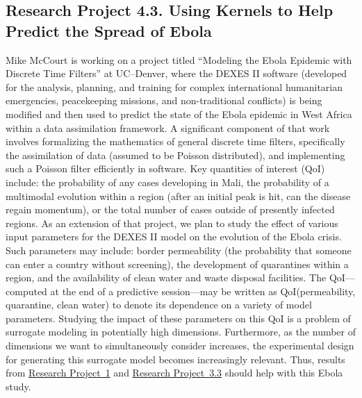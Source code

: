 \documentclass[11pt]{NSFamsart}
\newcommand{\refproba}{\hyperref[SectHSSVD]{Research Project~1}\xspace}
\newcommand{\refprobcc}{\hyperref[designsubsec]{Research Project~3.3}\xspace}
\begin{document}
\subsection*{Research Project 4.3. Using Kernels to Help Predict the Spread of Ebola} \label{ebolasubsec}
Mike McCourt is working on a project titled ``Modeling the Ebola Epidemic with Discrete Time Filters'' at UC--Denver, where the DEXES II software (developed for the analysis, planning, and training for complex international humanitarian emergencies, peacekeeping missions, and non-traditional conflicts) is being modified and then used to predict the state of the Ebola epidemic in West Africa within a data assimilation framework. A significant component of that work involves formalizing the mathematics of general discrete time filters, specifically the assimilation of data (assumed to be Poisson distributed), and implementing such a Poisson filter efficiently in software. Key quantities of interest (QoI) include: the probability of any cases developing in Mali, the probability of a multimodal evolution within a region (after an initial peak is hit, can the disease regain momentum), or the total number of cases outside of presently infected regions.
As an extension of that project, we plan to study the effect of various input parameters for the DEXES II model on the evolution of the Ebola crisis.  Such parameters may include: border permeability (the probability that someone can enter a country without screening), the development of quarantines within a region, and the availability of clean water and waste disposal facilities.  The QoI---computed at the end of a predictive session---may be written as QoI(permeability, quarantine, clean water) to denote its dependence on a variety of model parameters.  Studying the impact of these parameters on this QoI is a problem of surrogate modeling in potentially high dimensions.  Furthermore, as the number of dimensions we want to simultaneously consider increases, the experimental design for generating this surrogate model becomes increasingly relevant.  Thus, results from \refproba and \refprobcc should help with this Ebola study.
\end{document}
